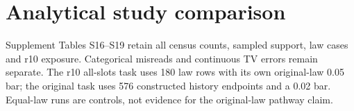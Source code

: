 \clearpage
\section{Analytical study comparison}\label{app:tables}


Supplement Tables S16--S19 retain all census counts, sampled support, law cases
and r10 exposure. Categorical misreads and continuous TV errors remain separate.
The r10 all-slots task uses 180 law rows with its own original-law 0.05 bar;
the original task uses 576 constructed history endpoints and a 0.02 bar.
Equal-law runs are controls, not evidence for the original-law pathway claim.
